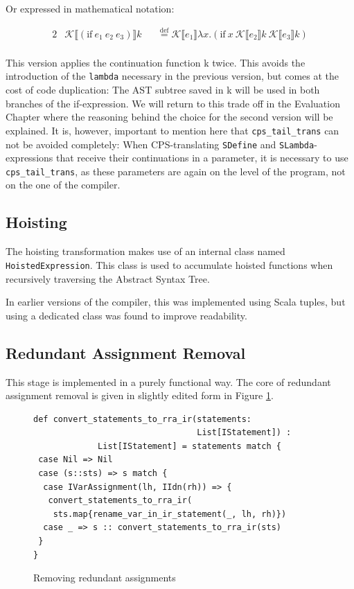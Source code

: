 \documentclass[11pt]{report}
\newcommand{\eqdef}{\stackrel{\text{def}}{=}}%
\newcommand{\cpstrans}[1]{\ensuremath{\mathcal{K}\llbracket #1 \rrbracket}}
\begin{document}
Or expressed in mathematical notation:

\begin{alignat*}{2}
&\cpstrans{(\text{if}\ e_1\ e_2\ e_3)} k &&\eqdef \cpstrans{e_1} \lambda x.(\text{if}\ x\ \cpstrans{e_2}k\ \cpstrans{e_3}k) \\
\end{alignat*}

This version applies the continuation function k twice. This avoids the introduction of the \texttt{lambda} necessary in the previous version, but comes at the cost of code duplication: The AST subtree saved in k will be used in both branches of the if-expression. We will return to this trade off in the Evaluation Chapter where the reasoning behind the choice for the second version will be explained. It is, however, important to mention here that \texttt{cps_tail_trans} can not be avoided completely: When CPS-translating \texttt{SDefine} and \texttt{SLambda}-expressions that receive their continuations in a parameter, it is necessary to use \texttt{cps_tail_trans}, as these parameters are again on the level of the program, not on the one of the compiler.


\subsection{Hoisting}
The hoisting transformation makes use of an internal class named \texttt{HoistedExpression}. This class is used to accumulate hoisted functions when recursively traversing the Abstract Syntax Tree.

In earlier versions of the compiler, this was implemented using Scala tuples, but using a dedicated class was found to improve readability. 


\subsection{Redundant Assignment Removal}
This stage is implemented in a purely functional way. The core of redundant assignment removal is given in slightly edited form in Figure \ref{remredasign1}.

\begin{figure}[ht]
\begin{lstlisting}
def convert_statements_to_rra_ir(statements: 
                                 List[IStatement]) : 
             List[IStatement] = statements match {
 case Nil => Nil
 case (s::sts) => s match {
  case IVarAssignment(lh, IIdn(rh)) => {
   convert_statements_to_rra_ir(
    sts.map{rename_var_in_ir_statement(_, lh, rh)})
  case _ => s :: convert_statements_to_rra_ir(sts)
 }
}
\end{lstlisting}
\caption{Removing redundant assignments}
\label{remredasign1}
\end{figure}
\end{document}
